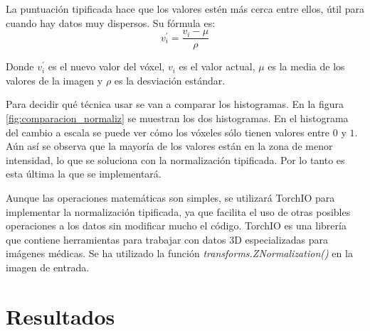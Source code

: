 La puntuación tipificada hace que los valores estén más cerca entre ellos, útil para cuando hay datos muy dispersos. Su fórmula es:
\begin{equation}
v_i^{'} = \frac{v_i - \mu}{\rho}
\end{equation}

Donde $v_i^{'}$ es el nuevo valor del vóxel, $v_i$ es el valor actual, $\mu$ es la media de los valores de la imagen y $\rho$ es la desviación estándar. \cite{znormalization}


Para decidir qué técnica usar se van a comparar los histogramas. En la figura \ref{fig:comparacion_normaliz} se muestran los dos histogramas. En el histograma del cambio a escala se puede ver cómo los vóxeles sólo tienen valores entre $0$ y $1$. Aún así se observa que la mayoría de los valores están en la zona de menor intensidad, lo que se soluciona con la normalización tipificada. Por lo tanto es esta última la que se implementará.

Aunque las operaciones matemáticas son simples, se utilizará TorchIO \cite{PerezGarcia2020} para implementar la normalización tipificada, ya que facilita el uso de otras posibles operaciones a los datos sin modificar mucho el código. TorchIO es una librería que contiene herramientas para trabajar con datos 3D especializadas para imágenes médicas. Se ha utilizado la función \textit{transforms.ZNormalization()} en la imagen de entrada.

\section{Resultados}\label{sec:apex_resultados}




